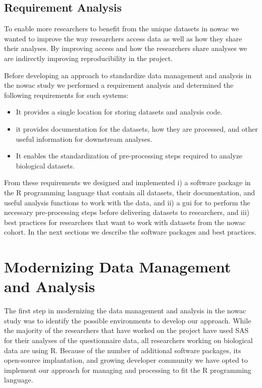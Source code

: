 \subsection{Requirement Analysis} 
To enable more researchers to benefit from the unique datasets in \gls{nowac} we
wanted to improve the way researchers access data as well as how they share
their analyses. By improving access and how the researchers share analyses we
are indirectly improving reproducibility in the project. 

Before developing an approach to standardize data management and analysis in the
\gls{nowac} study we performed a requirement analysis and determined the
following requirements for such systems: 

\begin{itemize} 
    \item It provides a single location for storing datasets and analysis code.
    \item it provides documentation for the datasets, how they are processed,
    and other useful information for downstream analyses. 
    \item It enables the standardization of pre-processing steps required to
    analyze biological datasets. 
\end{itemize}

From these requirements we designed and implemented i) a software package in the
R programming language that contain all datasets, their documentation, and
useful analysis functions to work with the data, and ii) a \gls{gui} for
to perform the necessary pre-processing steps before delivering
datasets to researchers, and iii) 
best practices for researchers that want to work with datasets from the
\gls{nowac} cohort. 
In the next sections we describe the software packages and best practices. 


\section{Modernizing Data Management and Analysis} 
The first step in modernizing the data management and analysis in the
\gls{nowac} study was to identify the possible environments to develop our
approach. While the majority of the researchers that have worked on the project
have used SAS for their analyses of the questionnaire data, all researchers
working on biological data are using R. Because of the number of additional
software  packages, its open-source implantation, and growing developer
community we have opted to implement our approach for managing and processing to
fit the R programming language. 

